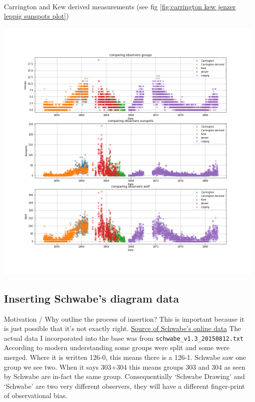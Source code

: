 \documentclass[12pt]{article}
\begin{document}
\\
{\centering
\caption{Carrington and Kew derived measurements (see fig \ref{fig:carrington kew jenzer leppig sunspots plot})}
\includegraphics[width=\linewidth]{carrington_kew_after_fix.png}
\label{fig:carrington, kew, leppig, jenzer after fix}
\par}


\subsection{Inserting Schwabe's diagram data}
Motivation / Why outline the process of insertion? This is important because it is just possible that it's not exactly right. \href{https://www.aip.de/Members/rarlt/sunspots/schwabe}{Source of Schwabe's online data} The actual data I incorporated into the base was from \texttt{schwabe\_v1.3\_20150812.txt}\\

According to modern understanding some groups were split and some were merged. Where it is written 126-0, this means there is a 126-1. Schwabe saw one group we see two. When it says 303+304 this means groups 303 and 304 as seen by Schwabe are in-fact the same group. Consequentially `Schwabe Drawing' and `Schwabe' are two very different observers, they will have a different finger-print of observational bias.\\
\end{document}
